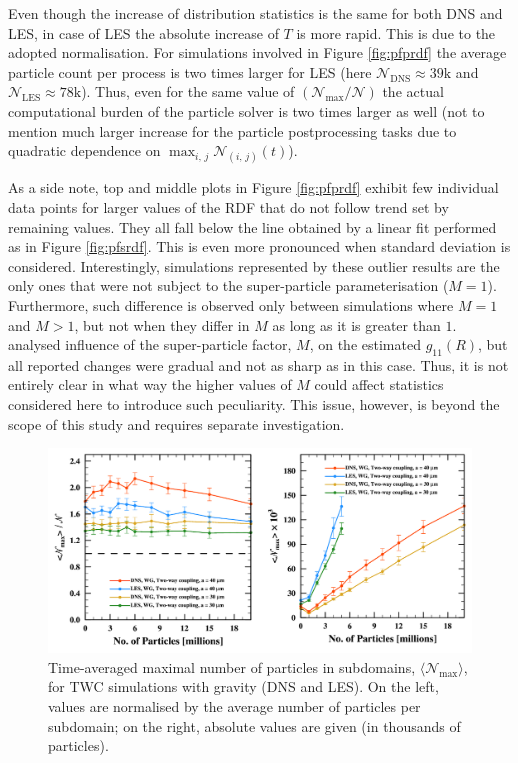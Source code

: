 \documentclass{pracamgren}
\begin{document}
Even though the increase of distribution statistics is the same for both DNS and LES, in case of LES the absolute increase of $T$ is more rapid.
This is due to the adopted normalisation.
For simulations involved in Figure \ref{fig:pfprdf} the average particle count per process is two times larger for LES (here $\mathcal{N}_{\text{DNS}} \approx 39\text{k}$ and $\mathcal{N}_{\text{LES}} \approx 78\text{k}$).
Thus, even for the same value of $(\mathcal{N}_{\max} / \mathcal{N})$ the actual computational burden of the particle solver is two times larger as well (not to mention much larger increase for the particle postprocessing tasks due to quadratic dependence on $\max_{i,\,j} \mathcal{N}_{(i,\,j)}(t)$).

As a side note, top and middle plots in Figure \ref{fig:pfprdf} exhibit few individual data points for larger values of the RDF that do not follow trend set by remaining values.
They all fall below the line obtained by a linear fit performed as in Figure \ref{fig:pfsrdf}.
This is even more pronounced when standard deviation is considered.
Interestingly, simulations represented by these outlier results are the only ones that were not subject to the super-particle parameterisation ($M=1$).
Furthermore, such difference is observed only between simulations where $M = 1$ and $M > 1$, but not when they differ in $M$ as long as it is greater than $1$.
\textcite{Rosa2022} analysed influence of the super-particle factor, $M$, on the estimated $g_{11}(R)$, but all reported changes were gradual and not as sharp as in this case.
Thus, it is not entirely clear in what way the higher values of $M$ could affect statistics considered here to introduce such peculiarity.
This issue, however, is beyond the scope of this study and requires separate investigation. 

\begin{figure}[h]
\centering
\includegraphics[width=13.5cm]{figures/3-16_pfptwc.pdf}
\caption{
Time-averaged maximal number of particles in subdomains, $\langle \mathcal{N}_{\max} \rangle$, for TWC simulations with gravity (DNS and LES).
On the left, values are normalised by the average number of particles per subdomain; on the right, absolute values are given (in thousands of particles).
}
\label{fig:pfptwc}
\end{figure}
\end{document}
